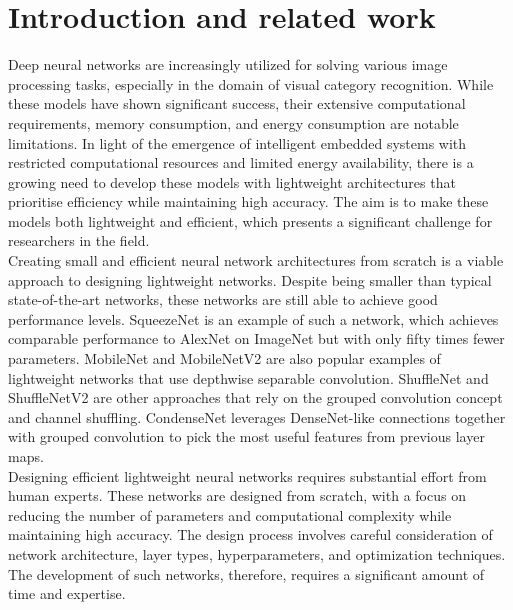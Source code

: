 \section{Introduction and related work}
Deep neural networks are increasingly utilized for solving various image
processing tasks, especially in the domain of visual category recognition.
While these models have shown significant success, their extensive computational
requirements, memory consumption, and energy consumption are notable
limitations. In light of the emergence of intelligent embedded systems with
restricted computational resources and limited energy availability, there is a
growing need to develop these models with lightweight architectures that
prioritise efficiency while maintaining high accuracy. The aim is to make these
models both lightweight and efficient, which presents a significant challenge for
researchers in the field.\\

Creating small and efficient neural network architectures from scratch is a
viable approach to designing lightweight networks. Despite being smaller than
typical state-of-the-art networks, these networks are still able to achieve good
performance levels. SqueezeNet \cite{DBLP:journals/corr/IandolaMAHDK16} is an
example of such a network, which achieves comparable performance to AlexNet on
ImageNet but with only fifty times fewer parameters. MobileNet
\cite{howard2017mobilenets} and MobileNetV2 \cite{DongMobileNetV2} are also
popular examples of lightweight networks that use depthwise separable
convolution. ShuffleNet \cite{ZhangShuffleNet} and ShuffleNetV2
\cite{MaShuffleNetV2} are other approaches that rely on the grouped convolution
concept and channel shuffling. CondenseNet \cite{huang2018condensenet} leverages
DenseNet-like \cite{huang2017densely} connections together with grouped convolution to pick the most useful features from previous layer maps.\\

Designing efficient lightweight neural networks requires substantial effort from
human experts. These networks are designed from scratch, with a focus on
reducing the number of parameters and computational complexity while maintaining
high accuracy. The design process involves careful consideration of network
architecture, layer types, hyperparameters, and optimization techniques. The
development of such networks, therefore, requires a significant amount of time
and expertise.\\

